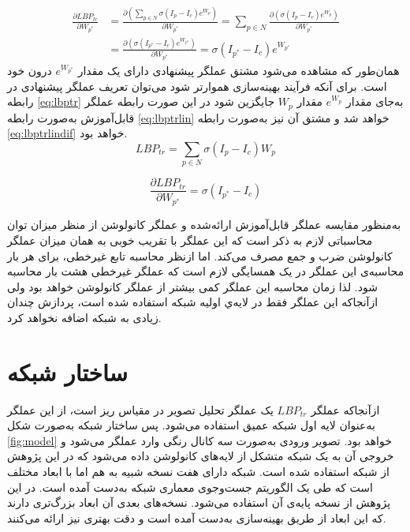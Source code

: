 \begin{align}\label{eq:lbptrdif}
	\frac{\partial LBP_{tr}}{\partial W_{p^*}} 
	&= \frac{\partial (\sum_{p\in N}\sigma(I_p-I_c)e^{W_p}) }{\partial W_{p^*}} 
	= \sum_{p\in N} {\frac{\partial (\sigma(I_p-I_c)e^{W_p}) }{\partial W_{p^*}} }
	\\&= 	\frac{\partial (\sigma(I_{p^*}-I_c)e^{W_{p^*}})}{\partial W_{p^*}}
	= \sigma(I_{p^*}-I_c)e^{W_{p^*}}
	\nonumber
\end{align}
همان‌طور که مشاهده می‌شود مشتق عملگر پیشنهادی دارای یک مقدار 
$e^{W_{p^*}}$
درون خود است. برای آنکه فرآیند بهینه‌سازی هموارتر شود می‌توان تعریف عملگر پیشنهادی در رابطه 
\ref{eq:lbptr}
به‌جای مقدار 
$e^{W_p}$
مقدار 
$W_p$
جایگزین شود در این صورت رابطه عملگر قابل‌آموزش به‌صورت رابطه 
\ref{eq:lbptrlin}
خواهد شد و مشتق آن نیز به‌صورت رابطه 
\ref{eq:lbptrlindif}
خواهد بود.
\begin{equation}\label{eq:lbptrlin}
	LBP_{tr}=\sum_{p\in N}\sigma(I_p-I_c)W_p 
\end{equation}

\begin{equation}\label{eq:lbptrlindif}
	\frac{\partial LBP_{tr}}{\partial W_{p^*}}=
	\sigma(I_{p^*}-I_c)
\end{equation}

به‌منظور مقایسه عملگر 
قابل‌آموزش ارائه‌شده و عملگر کانولوشن از منظر میزان توان محاسباتی لازم به ذکر است که این عملگر با تقریب خوبی به همان میزان عملگر کانولوشن ضرب و جمع مصرف می‌کند. اما از‌نظر محاسبه تابع غیر‌خطی، برای هر بار محاسبه‌ی این عملگر در یک همسایگی لازم است که عملگر غیر‌خطی هشت بار محاسبه شود. لذا زمان محاسبه این عملگر کمی بیشتر از عملگر کانولوشن خواهد بود ولی از‌آنجا‌که این عملگر فقط در لایه‌ي اولیه شبکه استفاده شده است، پردازش چندان زیادی به شبکه اضافه نخواهد کرد.

 \section{ساختار شبکه}

 ازآنجاکه عملگر  
$LBP_{tr}$
 یک عملگر تحلیل تصویر در مقیاس ریز است، از این عملگر به‌عنوان لایه اول شبکه عمیق استفاده می‌شود. پس ساختار شبکه به‌صورت شکل 
\ref{fig:model}
 خواهد بود.
 تصویر ورودی به‌صورت سه کانال رنگی وارد عملگر   می‌شود و خروجی آن به یک شبکه متشکل از لایه‌های کانولوشن داده می‌شود که در این پژوهش از شبکه
   \cite{tan2019efficientnet}
 استفاده شده است. شبکه 
 دارای هفت نسخه شبیه به هم اما با ابعاد مختلف است که طی یک الگوریتم جست‌و‌جوی معماری شبکه به‌دست آمده است. در این پژوهش از نسخه پایه‌ی آن استفاده می‌شود. نسخه‌های بعدی آن ابعاد بزرگ‌تری دارند که این ابعاد از طریق بهینه‌سازی به‌دست آمده است و دقت بهتری نیز ارائه می‌کنند.
 
